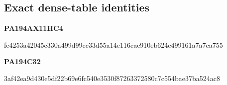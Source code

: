 \subsection{Exact dense-table identities}
\textbf{PA194AX11HC4}\par
{\small\ttfamily fe4253a42045c330a499d99cc33d55a1\allowbreak 4e116cae910eb624c499161a7a7ca755}\par
\textbf{PA194C32}\par
{\small\ttfamily 3af42ea9d430e5df22b69e6fc540e353\allowbreak 0f87263372580c7c554bae37ba524ac8}\par
